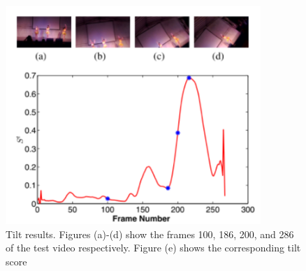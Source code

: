\documentclass{sig-alternate-05-2015}
\begin{document}
\begin{figure}
\centering
\includegraphics[scale=1]{img4.png}
\caption{Tilt results. Figures (a)-(d) show the frames 100, 186,
200, and 286 of the test video respectively. Figure (e) shows the
corresponding tilt score}
\end{figure}
\end{document}
